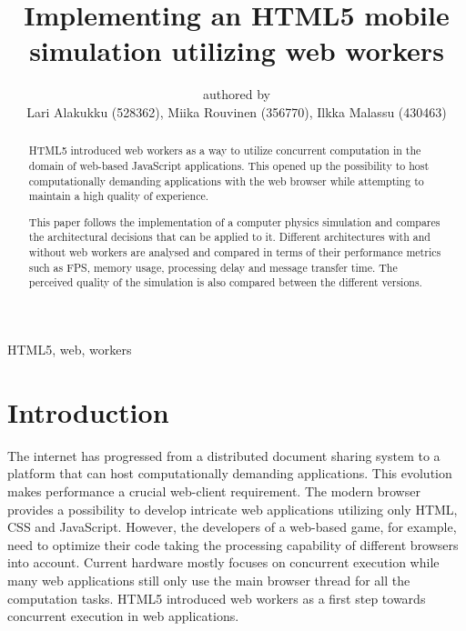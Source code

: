 \documentclass[conference]{IEEEtran}
\begin{document}
\title{Implementing an HTML5 mobile simulation utilizing web workers}

\author{authored by\\
        Lari Alakukku (528362),
        Miika Rouvinen (356770),
        Ilkka Malassu (430463)}%

\makeatletter         
\def\@maketitle{
\begin{center}
{\Huge \bfseries \sffamily \@title }\\[4ex] 
Submitted on \@date\\
{\normalsize \@author}\\[4ex] 
\end{center}}
\makeatother


\maketitle

\begin{IEEEkeywords}
HTML5, web, workers
\end{IEEEkeywords}

\begin{abstract}

HTML5 introduced web workers as a way to utilize concurrent computation in the domain of web-based JavaScript applications. This opened up the possibility to host 
computationally demanding applications with the web browser while attempting to maintain a high quality of experience.

This paper follows the implementation of a computer physics simulation and compares the architectural decisions that can be applied to it. Different architectures with and 
without web workers are analysed and compared in terms of their performance metrics such as FPS, memory usage, processing delay and message transfer time. The perceived 
quality of the simulation is also compared between the different versions.
 
\end{abstract}

\section{Introduction}
\label{chap:introduction}

The internet has progressed from a distributed document sharing system to a platform that can host computationally demanding applications. This evolution makes performance a crucial web-client requirement. The modern browser provides a possibility to develop intricate web applications utilizing only HTML, CSS and JavaScript. However, the developers of a web-based game, for example, need to optimize their code taking the processing capability of different browsers into account. Current hardware mostly focuses on concurrent execution while many web applications still only use the main browser thread for all the computation tasks. HTML5 introduced web workers as a first step towards concurrent execution in web applications. \cite{doha}
\end{document}
